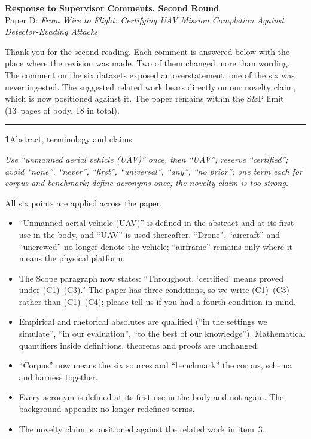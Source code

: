 \documentclass[11pt,a4paper]{article}
\newcommand{\thinrule}{\textcolor{rule}{\rule{\linewidth}{0.4pt}}}
\newenvironment{qitem}[3]{%
  \par\medskip\thinrule\par\smallskip
  \noindent\textbf{\textcolor{tag}{#1}}\quad\textcolor{qgrey}{\small #2}\par\smallskip
  \noindent\textcolor{qgrey}{\small\itshape #3}\par\smallskip
}{\par}
\newcommand{\where}[1]{\par\smallskip{\small\textcolor{tag}{$\hookrightarrow$}\ \textit{#1}}\par}
\begin{document}
\begin{center}
{\Large\bfseries Response to Supervisor Comments, Second Round}\\[0.35em]
{\large Paper D: \emph{From Wire to Flight: Certifying UAV Mission Completion
Against Detector-Evading Attacks}}\\[0.6em]
\end{center}

Thank you for the second reading. Each comment is answered below with the
place where the revision was made. Two of them changed more than wording. The
comment on the six datasets exposed an overstatement: one of the six was never
ingested. The suggested related work bears directly on our novelty claim, which
is now positioned against it. The paper remains within the S\&P limit
(13~pages of body, 18 in total).

\begin{qitem}{1}{Abstract, terminology and claims}{Use ``unmanned aerial
vehicle (UAV)'' once, then ``UAV''; reserve ``certified''; avoid ``none'',
``never'', ``first'', ``universal'', ``any'', ``no prior''; one term each for
corpus and benchmark; define acronyms once; the novelty claim is too strong.}
All six points are applied across the paper.
\begin{itemize}[leftmargin=1.4em,itemsep=1pt]
\item ``Unmanned aerial vehicle (UAV)'' is defined in the abstract and at its
first use in the body, and ``UAV'' is used thereafter. ``Drone'', ``aircraft''
and ``uncrewed'' no longer denote the vehicle; ``airframe'' remains only where it
means the physical platform.
\item The Scope paragraph now states: ``Throughout, `certified' means proved
under (C1)--(C3).'' The paper has three conditions, so we write (C1)--(C3)
rather than (C1)--(C4); please tell us if you had a fourth condition in mind.
\item Empirical and rhetorical absolutes are qualified (``in the settings we
simulate'', ``in our evaluation'', ``to the best of our knowledge'').
Mathematical quantifiers inside definitions, theorems and proofs are unchanged.
\item ``Corpus'' now means the six sources and ``benchmark'' the corpus, schema
and harness together.
\item Every acronym is defined at its first use in the body and not again. The
background appendix no longer redefines terms.
\item The novelty claim is positioned against the related work in item~3.
\end{itemize}
\where{Abstract, Introduction, Scope, throughout.}
\end{qitem}
\end{document}
